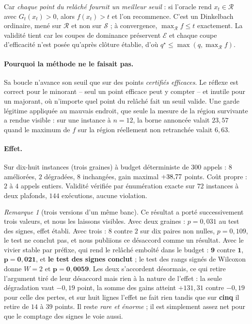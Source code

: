 \documentclass[11pt,a4paper]{article}
\theoremstyle{plain}
\theoremstyle{remark}
\newtheorem{remark}{Remarque}
\newcommand{\Ecal}{\mathcal{E}}
\newcommand{\Scal}{\mathcal{S}}
\newcommand{\Rcal}{\mathcal{R}}
\newcommand{\qs}{q^{\star}}
\begin{document}
\noindent
Car \emph{chaque point du relâché
fournit un meilleur seuil} : si l'oracle rend $x_t\in\Rcal$ avec
$G_t(x_t)>0$, alors $f(x_t)>t$ et l'on recommence. C'est un Dinkelbach
ordinaire, mené sur $\Rcal$ et non sur $\Scal$ ; à convergence,
$\max_{\Rcal}f\le t$ exactement. La validité tient car les coupes de
dominance préservent $\Ecal$ et chaque coupe d'efficacité n'est posée
qu'après clôture établie, d'où $\qs\le\max(q,\max_{\Rcal}f)$.

\paragraph{Pourquoi la méthode ne le faisait pas.} Sa boucle n'avance son
seuil que sur des points \emph{certifiés efficaces}. Le réflexe est correct
pour le minorant -- seul un point efficace peut y compter -- et inutile pour
un majorant, où n'importe quel point du relâché fait un seuil valide. Une
garde légitime appliquée au mauvais endroit, que seule la mesure de la
région survivante a rendue visible : sur une instance à $n=12$, la borne
annoncée valait $23{,}57$ quand le maximum de $f$ sur la région réellement
non retranchée valait $6{,}63$.

\paragraph{Effet.} Sur dix-huit instances (trois graines) à budget
déterministe de $300$ appels : $8$ améliorées, $2$ dégradées, $8$
inchangées, gain maximal $+38{,}77{}$ points. Coût propre : $2$ à $4$ appels
entiers. Validité vérifiée par énumération exacte sur $72$ instances à deux
plafonds, $144$ exécutions, aucune violation.

\begin{remark}[trois versions d'un même banc]
Ce résultat a porté successivement trois valeurs, et nous les laissons
visibles. Avec deux graines : $p=0{,}031$ au test des signes, effet établi.
Avec trois : $8$ contre $2$ sur dix paires non nulles, $p=0{,}109$, le test
ne conclut pas, et nous publiions ce désaccord comme un résultat. Avec le
vivier stable par préfixe, qui rend le relâché emboîté dans le budget :
$\mathbf{9}$ contre $\mathbf{1}$, $\mathbf{p=0{,}021}$, et \textbf{le test
des signes conclut} ; le test des rangs signés de Wilcoxon donne $W=2$ et
$\mathbf{p=0{,}0059}$. Les deux s'accordent désormais, ce qui retire
l'argument tiré de leur désaccord mais rien à la nature de l'effet : la
seule dégradation vaut $-0{,}19$ point, la somme des gains atteint
$+131{,}31$ contre $-0{,}19$ pour celle des pertes, et sur huit lignes
l'effet ne fait rien tandis que sur \textbf{cinq} il retire de $14$ à $39$
points. Il reste \emph{rare et énorme} ; il est simplement assez net pour
que le comptage des signes le voie aussi.
\end{remark}
\end{document}
